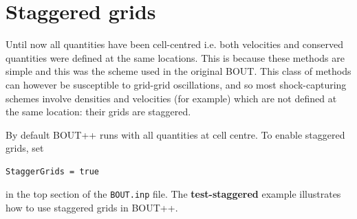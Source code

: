 \documentclass[12pt]{article}
\begin{document}
\section{Staggered grids}
%
\label{sec:staggergrids}
%
%
Until now all quantities have been cell-centred i.e. both velocities and
conserved quantities were defined at the same locations. This is because these
methods are simple and this was the scheme used in the original BOUT. This
class of methods can however be susceptible to grid-grid oscillations, and so
most shock-capturing schemes involve densities and velocities (for example)
which are not defined at the same location: their grids are staggered.

By default BOUT++ runs with all quantities at cell centre. To enable staggered
grids, set
%
\begin{verbatim}
StaggerGrids = true
\end{verbatim}
%
in the top section of the \texttt{BOUT.inp} file. The {\bf test-staggered}
example illustrates how to use staggered grids in BOUT++.
\end{document}
